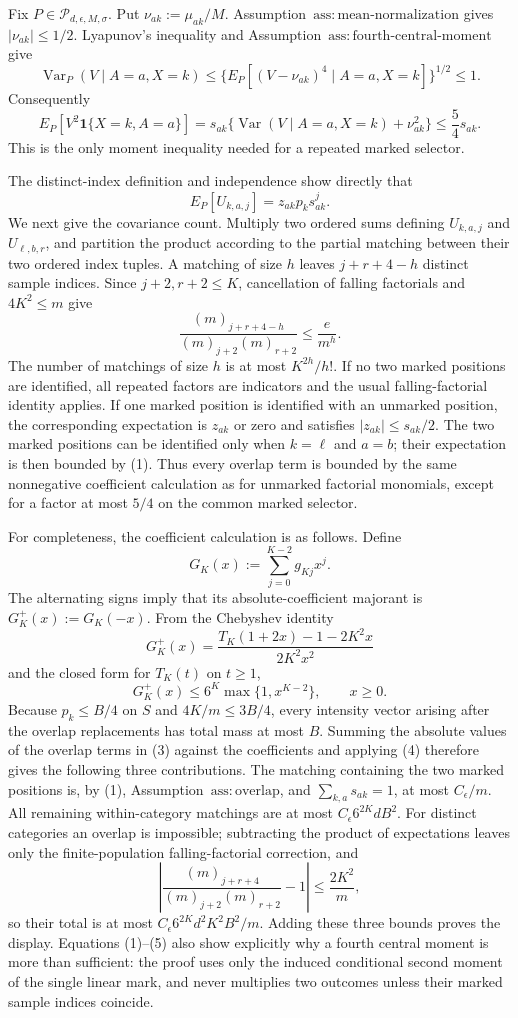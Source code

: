Fix \(P\in\mathcal P_{d,\epsilon,M,\sigma}\).  Put \(\nu_{ak}:=\mu_{ak}/M\).  Assumption~\(\mathrm{ass:mean\text{-}normalization}\) gives \(|\nu_{ak}|\le1/2\).  Lyapunov's inequality and Assumption~\(\mathrm{ass:fourth\text{-}central\text{-}moment}\) give
\[
 \operatorname{Var}_P(V\mid A=a,X=k)
 \le \{E_P[(V-\nu_{ak})^4\mid A=a,X=k]\}^{1/2}\le1.
\]
Consequently
\[
 E_P[V^2\mathbf 1\{X=k,A=a\}]
 =s_{ak}\{\operatorname{Var}(V\mid A=a,X=k)+\nu_{ak}^2\}
 \le\frac54s_{ak}.
\tag{1}
\]
This is the only moment inequality needed for a repeated marked selector.

The distinct-index definition and independence show directly that
\[
 E_P[U_{k,a,j}]=z_{ak}p_ks_{ak}^{j}.
\tag{2}
\]
We next give the covariance count.  Multiply two ordered sums defining \(U_{k,a,j}\) and \(U_{\ell,b,r}\), and partition the product according to the partial matching between their two ordered index tuples.  A matching of size \(h\) leaves \(j+r+4-h\) distinct sample indices.  Since \(j+2,r+2\le K\), cancellation of falling factorials and \(4K^2\le m\) give
\[
 \frac{(m)_{j+r+4-h}}{(m)_{j+2}(m)_{r+2}}
 \le \frac{e}{m^h}.
\tag{3}
\]
The number of matchings of size \(h\) is at most \(K^{2h}/h!\).  If no two marked positions are identified, all repeated factors are indicators and the usual falling-factorial identity applies.  If one marked position is identified with an unmarked position, the corresponding expectation is \(z_{ak}\) or zero and satisfies \(|z_{ak}|\le s_{ak}/2\).  The two marked positions can be identified only when \(k=\ell\) and \(a=b\); their expectation is then bounded by (1).  Thus every overlap term is bounded by the same nonnegative coefficient calculation as for unmarked factorial monomials, except for a factor at most \(5/4\) on the common marked selector.

For completeness, the coefficient calculation is as follows.  Define
\[
 G_K(x):=\sum_{j=0}^{K-2}g_{Kj}x^j.
\]
The alternating signs imply that its absolute-coefficient majorant is \(G_K^+(x):=G_K(-x)\).  From the Chebyshev identity
\[
 G_K^+(x)=\frac{T_K(1+2x)-1-2K^2x}{2K^2x^2}
\]
and the closed form for \(T_K(t)\) on \(t\ge1\),
\[
 G_K^+(x)\le6^K\max\{1,x^{K-2}\},\qquad x\ge0.
\tag{4}
\]
Because \(p_k\le B/4\) on \(S\) and \(4K/m\le3B/4\), every intensity vector arising after the overlap replacements has total mass at most \(B\).  Summing the absolute values of the overlap terms in (3) against the coefficients and applying (4) therefore gives the following three contributions.  The matching containing the two marked positions is, by (1), Assumption~\(\mathrm{ass:overlap}\), and \(\sum_{k,a}s_{ak}=1\), at most \(C_{\epsilon}/m\).  All remaining within-category matchings are at most \(C_{\epsilon}6^{2K}dB^2\).  For distinct categories an overlap is impossible; subtracting the product of expectations leaves only the finite-population falling-factorial correction, and
\[
 \left|\frac{(m)_{j+r+4}}{(m)_{j+2}(m)_{r+2}}-1\right|
 \le \frac{2K^2}{m},
\tag{5}
\]
so their total is at most \(C_{\epsilon}6^{2K}d^2K^2B^2/m\).  Adding these three bounds proves the display.  Equations (1)--(5) also show explicitly why a fourth central moment is more than sufficient: the proof uses only the induced conditional second moment of the single linear mark, and never multiplies two outcomes unless their marked sample indices coincide.